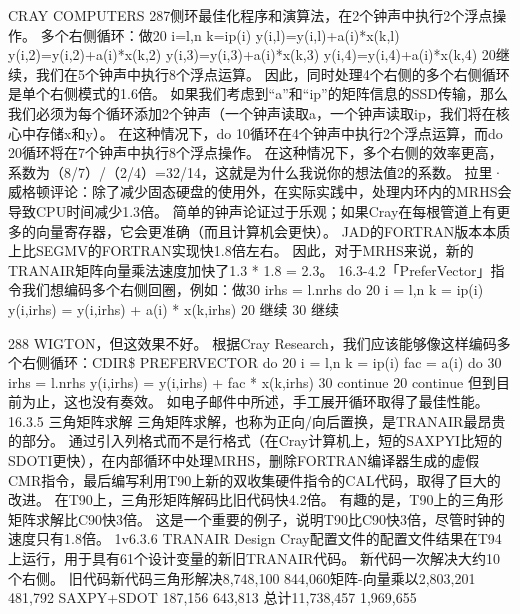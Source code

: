 \documentclass[UTF8,11pt,a4paper,openany,fontset=fandol]{ctexbook}
\begin{document}
CRAY COMPUTERS 287侧环最佳化程序和演算法，在2个钟声中执行2个浮点操作。 多个右侧循环：做20 i=l,n k=ip(i) y(i,l)=y(i,l)+a(i)*x(k,l) y(i,2)=y(i,2)+a(i)*x(k,2) y(i,3)=y(i,3)+a(i)*x(k,3) y(i,4)=y(i,4)+a(i)*x(k,4) 20继续，我们在5个钟声中执行8个浮点运算。 因此，同时处理4个右侧的多个右侧循环是单个右侧模式的1.6倍。 如果我们考虑到“a”和“ip”的矩阵信息的SSD传输，那么我们必须为每个循环添加2个钟声（一个钟声读取a，一个钟声读取ip，我们将在核心中存储x和y）。 在这种情况下，do 10循环在4个钟声中执行2个浮点运算，而do 20循环将在7个钟声中执行8个浮点操作。 在这种情况下，多个右侧的效率更高，系数为（8/7）/（2/4）=32/14，这就是为什么我说你的想法值2的系数。 拉里·威格顿评论：除了减少固态硬盘的使用外，在实际实践中，处理内环内的MRHS会导致CPU时间减少1.3倍。 简单的钟声论证过于乐观；如果Cray在每根管道上有更多的向量寄存器，它会更准确（而且计算机会更快）。 JAD的FORTRAN版本本质上比SEGMV的FORTRAN实现快1.8倍左右。 因此，对于MRHS来说，新的TRANAIR矩阵向量乘法速度加快了1.3 * 1.8 = 2.3。 16.3-4.2「PreferVector」指令我们想编码多个右侧回圈，例如：做30 irhs = l.nrhs do 20 i = l,n k = ip(i) y(i,irhs) = y(i,irhs) + a(i) * x(k,irhs) 20 继续 30 继续

288 WIGTON，但这效果不好。 根据Cray Research，我们应该能够像这样编码多个右侧循环：CDIR\$ PREFERVECTOR do 20 i = l,n k = ip(i) fac = a(i) do 30 irhs = l.nrhs y(i,irhs) = y(i,irhs) + fac * x(k,irhs) 30 continue 20 continue 但到目前为止，这也没有奏效。 如电子邮件中所述，手工展开循环取得了最佳性能。 16.3.5 三角矩阵求解 三角矩阵求解，也称为正向/向后置换，是TRANAIR最昂贵的部分。 通过引入列格式而不是行格式（在Cray计算机上，短的SAXPYI比短的SDOTI更快），在内部循环中处理MRHS，删除FORTRAN编译器生成的虚假CMR指令，最后编写利用T90上新的双收集硬件指令的CAL代码，取得了巨大的改进。 在T90上，三角形矩阵解码比旧代码快4.2倍。 有趣的是，T90上的三角形矩阵求解比C90快3倍。 这是一个重要的例子，说明T90比C90快3倍，尽管时钟的速度只有1.8倍。 1v6.3.6 TRANAIR Design Cray配置文件的配置文件结果在T94上运行，用于具有61个设计变量的新旧TRANAIR代码。 新代码一次解决大约10个右侧。 旧代码新代码三角形解决8,748,100 844,060矩阵-向量乘以2,803,201 481,792 SAXPY+SDOT 187,156 643,813 总计11,738,457 1,969,655
\end{document}
